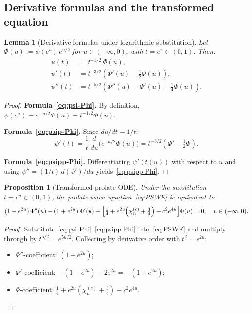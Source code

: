 \documentclass[12pt,a4paper]{amsart}
\newtheorem{lemma}[theorem]{Lemma}
\newtheorem{proposition}[theorem]{Proposition}
\theoremstyle{remark}
\begin{document}
\subsection{Derivative formulas and the transformed equation}
\label{ssec:log-sub}

\begin{lemma}[Derivative formulas under logarithmic substitution]
\label{lem:deriv-formulas}
Let $\Phi(u) := \psi(e^u)\,e^{u/2}$ for $u \in (-\infty, 0)$,
with $t = e^u \in (0,1)$. Then:
\begin{align}
\psi(t) &= t^{-1/2}\,\Phi(u), \label{eq:psi-Phi}\\[4pt]
\psi'(t) &= t^{-3/2}\!\left(\Phi'(u) - \tfrac{1}{2}\Phi(u)\right), \label{eq:psip-Phi}\\[4pt]
\psi''(t) &= t^{-5/2}\!\left(\Phi''(u) - \Phi'(u) + \tfrac{1}{4}\Phi(u)\right). \label{eq:psipp-Phi}
\end{align}
\end{lemma}

\begin{proof}
\textbf{Formula~\eqref{eq:psi-Phi}.} By definition, $\psi(e^u) = e^{-u/2}\Phi(u) = t^{-1/2}\Phi(u)$.

\medskip\noindent
\textbf{Formula~\eqref{eq:psip-Phi}.} Since $du/dt = 1/t$:
\[
\psi'(t) = \frac{1}{t}\,\frac{d}{du}\!\bigl(e^{-u/2}\Phi(u)\bigr)
= t^{-3/2}\!\left(\Phi' - \tfrac{1}{2}\Phi\right).
\]

\medskip\noindent
\textbf{Formula~\eqref{eq:psipp-Phi}.} Differentiating $\psi'(t(u))$ with respect to $u$
and using $\psi'' = (1/t)\,d(\psi')/du$ yields~\eqref{eq:psipp-Phi}.
\end{proof}

\begin{proposition}[Transformed prolate ODE]
\label{prop:transformed-ode}
Under the substitution $t = e^u \in (0,1)$, the prolate wave
equation~\eqref{eq:PSWE} is equivalent to
\begin{equation}
\label{eq:Phi-ODE}
(1 - e^{2u})\,\Phi''(u)
- (1 + e^{2u})\,\Phi'(u)
+ \Bigl[\tfrac{1}{4}
+ e^{2u}\!\left(\chi_n^{(c)} + \tfrac{3}{4}\right)
- c^2 e^{4u}\Bigr]\Phi(u)
= 0,
\quad u \in (-\infty, 0).
\end{equation}
\end{proposition}

\begin{proof}
Substitute~\eqref{eq:psi-Phi}--\eqref{eq:psipp-Phi}
into~\eqref{eq:PSWE} and multiply through by $t^{5/2} = e^{5u/2}$.
Collecting by derivative order with $t^2 = e^{2u}$:
\begin{itemize}
\item $\Phi''$-coefficient: $(1 - e^{2u})$;
\item $\Phi'$-coefficient: $-(1-e^{2u}) - 2e^{2u} = -(1 + e^{2u})$;
\item $\Phi$-coefficient: $\tfrac{1}{4} + e^{2u}(\chi_n^{(c)}+\tfrac{3}{4}) - c^2 e^{4u}$.
\end{itemize}
\end{proof}
\end{document}
